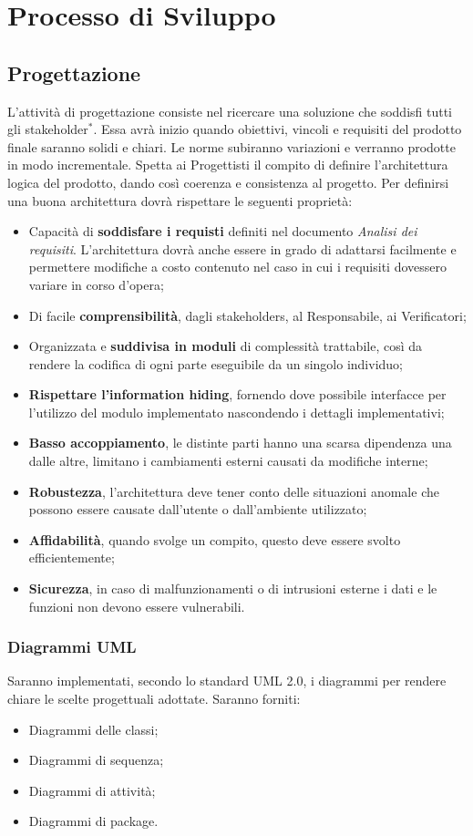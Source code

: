 \documentclass[11pt,a4paper]{article}
\begin{document}
	\section{Processo di Sviluppo}
	\subsection{Progettazione}
	L'attività di progettazione consiste nel ricercare una soluzione che soddisfi tutti gli stakeholder$^*$. Essa avrà inizio quando obiettivi, vincoli e requisiti del prodotto finale saranno solidi e chiari. Le norme subiranno variazioni e verranno prodotte in modo incrementale. Spetta ai Progettisti il compito di definire l'architettura logica del prodotto, dando così coerenza e consistenza al progetto. Per definirsi una buona architettura dovrà rispettare le seguenti proprietà:
	\begin{itemize}
		\item Capacità di \textbf{soddisfare i requisti} definiti nel documento \textit{Analisi dei requisiti}. L'architettura dovrà anche essere in grado di adattarsi facilmente e permettere modifiche a costo contenuto nel caso in cui i requisiti dovessero variare in corso d'opera;
		\item Di facile \textbf{comprensibilità}, dagli stakeholders, al Responsabile, ai Verificatori;
		\item Organizzata e \textbf{suddivisa in moduli} di complessità trattabile, così da rendere la codifica di ogni parte eseguibile da un singolo individuo;
		\item \textbf{Rispettare l'information hiding}, fornendo dove possibile interfacce per l'utilizzo del modulo implementato nascondendo i dettagli implementativi;
		\item \textbf{Basso accoppiamento}, le distinte parti hanno una scarsa dipendenza una dalle altre, limitano i cambiamenti esterni causati da modifiche interne;
		\item \textbf{Robustezza}, l'architettura deve tener conto delle situazioni anomale che possono essere causate dall'utente o dall'ambiente utilizzato;
		\item \textbf{Affidabilità}, quando svolge un compito, questo deve essere svolto efficientemente;
		\item \textbf{Sicurezza}, in caso di malfunzionamenti o di intrusioni esterne i dati e le funzioni non devono essere vulnerabili.
	\end{itemize}	
	\subsubsection{Diagrammi UML} Saranno implementati, secondo lo standard UML 2.0, i diagrammi per rendere chiare le scelte progettuali adottate. Saranno forniti:
	\begin{itemize}
		\item Diagrammi delle classi;
		\item Diagrammi di sequenza;
		\item Diagrammi di attività;
		\item Diagrammi di package.
	\end{itemize}
\end{document}
